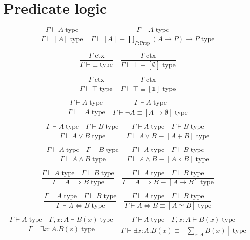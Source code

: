\documentclass{book}
\begin{document}
\section{Predicate logic}

$$\frac{\Gamma \vdash A \; \mathrm{type}}{\Gamma \vdash [A] \; \mathrm{type}} \quad \frac{\Gamma \vdash A \; \mathrm{type}}{\Gamma \vdash [A] \equiv \prod_{P:\mathrm{Prop}} (A \to P) \to P \; \mathrm{type}}$$

$$\frac{\Gamma \; \mathrm{ctx}}{\Gamma \vdash \bot \; \mathrm{type}} \quad \frac{\Gamma \; \mathrm{ctx}}{\Gamma \vdash \bot \equiv [\emptyset] \; \mathrm{type}}$$

$$\frac{\Gamma \; \mathrm{ctx}}{\Gamma \vdash \top \; \mathrm{type}} \quad \frac{\Gamma \; \mathrm{ctx}}{\Gamma \vdash \top \equiv [\mathbb{1}] \; \mathrm{type}}$$

$$\frac{\Gamma \vdash A \; \mathrm{type}}{\Gamma \vdash \neg A \; \mathrm{type}} \quad \frac{\Gamma \vdash A \; \mathrm{type}}{\Gamma \vdash \neg A \equiv [A \to \emptyset] \; \mathrm{type}}$$

$$\frac{\Gamma \vdash A \; \mathrm{type} \quad \Gamma \vdash B \; \mathrm{type}}{\Gamma \vdash A \vee B \; \mathrm{type}} \quad \frac{\Gamma \vdash A \; \mathrm{type} \quad \Gamma \vdash B \; \mathrm{type}}{\Gamma \vdash A \vee B \equiv [A + B] \; \mathrm{type}}$$

$$\frac{\Gamma \vdash A \; \mathrm{type} \quad \Gamma \vdash B \; \mathrm{type}}{\Gamma \vdash A \wedge B \; \mathrm{type}} \quad \frac{\Gamma \vdash A \; \mathrm{type} \quad \Gamma \vdash B \; \mathrm{type}}{\Gamma \vdash A \wedge B \equiv [A \times B] \; \mathrm{type}}$$

$$\frac{\Gamma \vdash A \; \mathrm{type} \quad \Gamma \vdash B \; \mathrm{type}}{\Gamma \vdash A \implies B \; \mathrm{type}} \quad \frac{\Gamma \vdash A \; \mathrm{type} \quad \Gamma \vdash B \; \mathrm{type}}{\Gamma \vdash A \implies B \equiv [A \to B] \; \mathrm{type}}$$

$$\frac{\Gamma \vdash A \; \mathrm{type} \quad \Gamma \vdash B \; \mathrm{type}}{\Gamma \vdash A \iff B \; \mathrm{type}} \quad \frac{\Gamma \vdash A \; \mathrm{type} \quad \Gamma \vdash B \; \mathrm{type}}{\Gamma \vdash A \iff B \equiv [A \simeq B] \; \mathrm{type}}$$

$$\frac{\Gamma \vdash A \; \mathrm{type} \quad \Gamma, x:A \vdash B(x) \; \mathrm{type}}{\Gamma \vdash \exists x:A.B(x) \; \mathrm{type}} \quad \frac{\Gamma \vdash A \; \mathrm{type} \quad \Gamma, x:A \vdash B(x) \; \mathrm{type}}{\Gamma \vdash \exists x:A.B(x) \equiv \left[\sum_{x:A} B(x)\right] \; \mathrm{type}}$$
\end{document}
